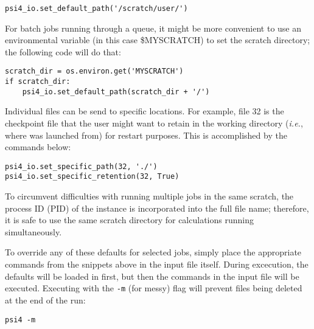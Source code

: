 \begin{verbatim}
psi4_io.set_default_path('/scratch/user/')
\end{verbatim}

For batch jobs running through a queue, it might be more convenient to use an
environmental variable (in this case \$MYSCRATCH) to set the scratch directory;
the following code will do that:

\begin{verbatim}
scratch_dir = os.environ.get('MYSCRATCH')
if scratch_dir:
    psi4_io.set_default_path(scratch_dir + '/')
\end{verbatim}

Individual files can be send to specific locations.  For example, file 32 is
the checkpoint file that the user might want to retain in the working directory
({\it i.e.}, where \PSIfour was launched from) for restart purposes.  This is
accomplished by the commands below:

\begin{verbatim}
psi4_io.set_specific_path(32, './')
psi4_io.set_specific_retention(32, True)
\end{verbatim}

To circumvent difficulties with running multiple jobs in the same scratch, the
process ID (PID) of the \PSIfour instance is incorporated into the full file
name; therefore, it is safe to use the same scratch directory for calculations
running simultaneously.

To override any of these defaults for selected jobs, simply place the
appropriate commands from the snippets above in the input file itself.  During
excecution, the \psirc defaults will be loaded in first, but then the commands
in the input file will be executed.  Executing \PSIfour with the {\tt -m} (for
messy) flag will prevent files being deleted at the end of the run:

\begin{verbatim}
psi4 -m
\end{verbatim}

